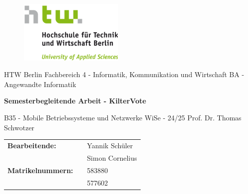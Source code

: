 \documentclass[11pt,a4paper,headsepline,footsepline,bibliography=totocnumbered]{article}
\begin{document}
\pagestyle{fancy}

\thispagestyle{empty}

\begin{center}
  \begin{figure}[h]
    \includegraphics[width=5cm]{pictures/htw-logo.png}
  \end{figure}

  \vspace{0.25cm}

  \huge{HTW Berlin}
  \linebreak
  \Large{Fachbereich 4 - Informatik, Kommunikation und Wirtschaft}
  \linebreak
  \Large{BA - Angewandte Informatik}
  \linebreak

  \vspace{0.25cm}

  \textbf{\Huge{Semesterbegleitende Arbeit - KilterVote}}

  \vspace{0.25cm}

  \Large{B35 - Mobile Betriebssysteme und Netzwerke}
  \linebreak
  \large{WiSe - 24/25}
  \linebreak
  \large{Prof. Dr. Thomas Schwotzer}
\end{center}

\vspace{1cm}



\begin{flushleft}
\begin{tabular}{lll}
  \textbf{Bearbeitende:} & & Yannik Schüler \\ & & Simon Cornelius \\
  \textbf{Matrikelnummern:} & & 583880 \\ & &  577602 \\
\end{tabular}


\end{flushleft}
\end{document}
